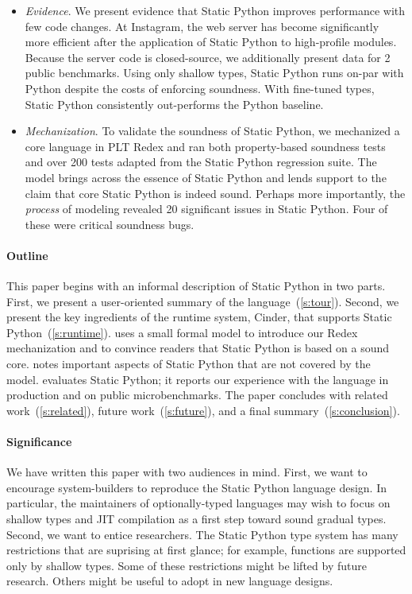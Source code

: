 \documentclass[english,cleveref,submission]{programming}
\newcommand{\SP}{Static Python}
\newcommand{\numbenchmark}{2}
\begin{document}
\begin{itemize}
  \item
    \emph{Evidence}.
    We present evidence that \SP{} improves performance with few code changes.
    At Instagram, the web server has become significantly more efficient
    after the application of \SP{} to high-profile modules.
    Because the server code is closed-source, we additionally present data for
    \numbenchmark{} public benchmarks.
    Using only shallow types, \SP{} runs on-par with Python despite the costs of
    enforcing soundness.
    With fine-tuned types, \SP{} consistently out-performs the Python baseline.

  \item
    \emph{Mechanization}.
    To validate the soundness of \SP{}, we mechanized a core language in PLT Redex
    and ran both property-based soundness tests and over 200 tests adapted from the \SP{} regression suite.
    The model brings across the essence of \SP{} and lends support to the claim
    that core \SP{} is indeed sound.
    Perhaps more importantly, the \emph{process} of modeling revealed 20 significant
    issues in \SP{}.
    Four of these were critical soundness bugs.

\end{itemize}

\paragraph*{Outline}

This paper begins with an informal description of \SP{} in two parts.
First, we present a user-oriented summary of the language~(\cref{s:tour}).
Second, we present the key ingredients of the runtime system, Cinder,
that supports \SP{}~(\cref{s:runtime}).
 uses a small formal model to introduce our Redex mechanization
and to convince readers that \SP{} is based on a sound core.
 notes important aspects of \SP{} that are not covered by the model.
 evaluates \SP{}; it reports our experience with the language in
production and on public microbenchmarks.
The paper concludes with related work~(\cref{s:related}),
future work~(\cref{s:future}), and a final summary~(\cref{s:conclusion}).


\paragraph*{Significance}

We have written this paper with two audiences in mind.
First, we want to encourage system-builders to reproduce the
\SP{} language design.
In particular, the maintainers of optionally-typed languages
may wish to focus on shallow types and JIT compilation as a
first step toward sound gradual types.
Second, we want to entice researchers.
The \SP{} type system has many restrictions that are suprising
at first glance; for example, functions are supported only by
shallow types.
Some of these restrictions might be lifted by future research.
Others might be useful to adopt in new language designs.
\end{document}
